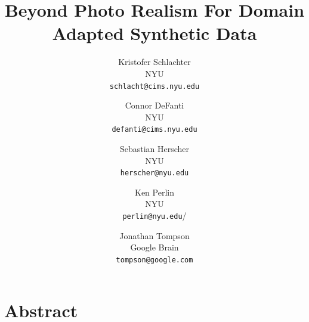 \documentclass[10pt,twocolumn,letterpaper]{article}
\newcommand{\tompson}[1]{{\color{green} JT: #1}}
\begin{document}
\title{Beyond Photo Realism For Domain Adapted Synthetic Data}

\author{Kristofer Schlachter\\
NYU\\
{\tt\small schlacht@cims.nyu.edu}
\and
Connor DeFanti\\
NYU\\
{\tt\small defanti@cims.nyu.edu}
\and
Sebastian Herscher\\
NYU\\
{\tt\small herscher@nyu.edu}
\and
Ken Perlin\\
NYU\\
{\tt\small perlin@nyu.edu}/
\and
Jonathan Tompson\\
Google Brain\\
{\tt\small tompson@google.com}
}

\maketitle
\maketitle

\section{Abstract}
\end{document}
